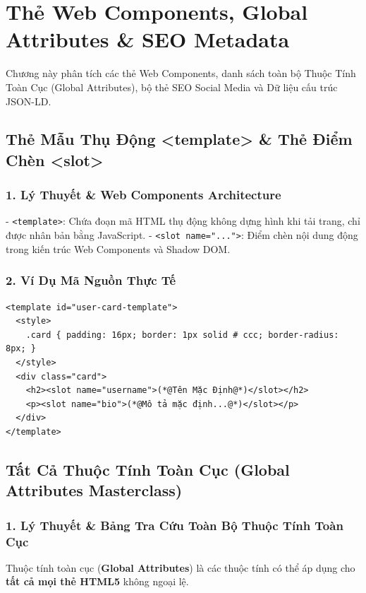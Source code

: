 \documentclass[11pt,oneside]{book}
\newcommand{\codeinline}[1]{\textcolor{accentOrange}{\texttt{#1}}}
\newcommand{\term}[1]{\textbf{\textcolor{primaryBlue}{#1}}}
\begin{document}
\chapter{Thẻ Web Components, Global Attributes \& SEO Metadata}
\label{chap:web_components_seo}

Chương này phân tích các thẻ Web Components, danh sách toàn bộ Thuộc Tính Toàn Cục (Global Attributes), bộ thẻ SEO Social Media và Dữ liệu cấu trúc JSON-LD.

\section{Thẻ Mẫu Thụ Động <template> \& Thẻ Điểm Chèn <slot>}
\subsection{1. Lý Thuyết \& Web Components Architecture}
- \codeinline{<template>}: Chứa đoạn mã HTML thụ động không dựng hình khi tải trang, chỉ được nhân bản bằng JavaScript.
- \codeinline{<slot name="...">}: Điểm chèn nội dung động trong kiến trúc Web Components và Shadow DOM.

\subsection{2. Ví Dụ Mã Nguồn Thực Tế}
\begin{lstlisting}[language=HTML5, caption={Ví dụ định nghĩa thẻ template và named slot}]
<template id="user-card-template">
  <style>
    .card { padding: 16px; border: 1px solid # ccc; border-radius: 8px; }
  </style>
  <div class="card">
    <h2><slot name="username">(*@Tên Mặc Định@*)</slot></h2>
    <p><slot name="bio">(*@Mô tả mặc định...@*)</slot></p>
  </div>
</template>
\end{lstlisting}

\section{Tất Cả Thuộc Tính Toàn Cục (Global Attributes Masterclass)}
\subsection{1. Lý Thuyết \& Bảng Tra Cứu Toàn Bộ Thuộc Tính Toàn Cục}
Thuộc tính toàn cục (\term{Global Attributes}) là các thuộc tính có thể áp dụng cho \textbf{tất cả mọi thẻ HTML5} không ngoại lệ.
\end{document}
